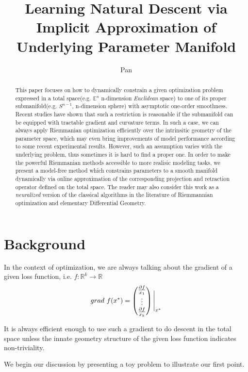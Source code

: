 \documentclass[letterpaper]{article}
\title{Learning Natural Descent via Implicit Approximation of Underlying Parameter Manifold}
\author{Pan}
\begin{document}
\maketitle
\begin{abstract}
  This paper focuses on how to dynamically constrain a given optimization problem expressed in a total space(e.g. $\mathbb{E}^n$ n-dimension \textit{Euclidean} space) to one of its proper submanifold(e.g. $S^{n-1}$, n-dimension sphere) with asymptotic one-order smoothness.
  Recent studies have shown that such a restriction is reasonable if the submanifold can be equipped with tractable gradient and curvature terms. In such a case, we can always
  apply Riemmanian optimization efficiently over the intrinsitic geometry of the parameter space, which may even bring improvements of model performance according to some recent experimental results. However, such an assumption
  varies with the underlying problem, thus sometimes it is hard to find a proper one. In order to make the powerful Riemmanian methods accessible to more realisic modeling tasks, we present a model-free method which constrains
  parameters to a smooth manifold dynamically via online approximation of the corresponding projection and retraction operator defined on the total space. The reader may also consider this work as a \textit{neuralized} version of the
  classical algorithms in the literature of Riemmannian optimization and elementary Differential Geometry.
\end{abstract}

\section{Background}
In the context of optimization, we are always talking about the gradient of a given loss function, i.e. $f:\mathbb{R}^k\to{\mathbb{R}}$
$$
grad\text{ } f(x^{*})=  \begin{pmatrix}
  \frac{\partial{f}}{x_1} \\
  \vdots \\
  \frac{\partial{f}}{x_k} \\
\end{pmatrix}\Bigg{|}_{x^{*}}
$$

It is always efficient enough to use such a gradient to do descent in the total space unless the innate geometry structure of the given loss function indicates non-triviality.

We begin our discussion by presenting a toy problem to illustrate our first point.
\end{document}
